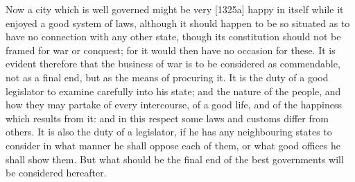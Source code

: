 Now a city which is well governed might be very [1325a] happy in itself
while it enjoyed a good system of laws, although it should happen to be so
situated as to have no connection with any other state, though its
constitution should not be framed for war or conquest; for it would then
have no occasion for these. It is evident therefore that the business of
war is to be considered as commendable, not as a final end, but as the
means of procuring it. It is the duty of a good legislator to examine
carefully into his state; and the nature of the people, and how they may
partake of every intercourse, of a good life, and of the happiness which
results from it: and in this respect some laws and customs differ from
others. It is also the duty of a legislator, if he has any neighbouring
states to consider in what manner he shall oppose each of them, or what
good offices he shall show them. But what should be the final end of the
best governments will be considered hereafter.



